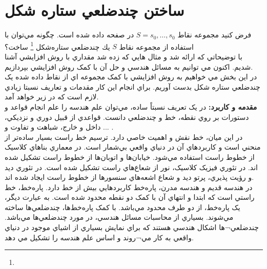 \documentclass{book}
\begin{document}
	    \section*{ساختن چندضلعي ستاره‌ شكل}
	 	فرض كنيد مجموعه نقاط
	 	$S = {s_{0}, \dots, s_{0}}$ 
	 	در صفحه داده شده است. چگونه مي‌توان با استفاده از مجموعه نقاط $S$ يك چندضلعي ستاره‌شكل 
	 	\footnote{}
	 	 ساخت؟\\
	 	با توضيحاتي که ارائه شد و مثال هايي که زده شد مقداري با روش افزايشي آشنا شديم. اکنون مي توانيم به مسائل هندسي و حل آن با کمک روش افزايشي بپردازيم.\\
	 	در اين بخش مي خواهيم به روش افزايشي با کمک مجموعه اي از نقاط داده شده يک چندضلعي ستاره شکل بدست آوريم. براي انجام اين کار مقدمات و تعاريف نسبتا زيادي لازم است که در زير خواهد آمد. \\
	 	\textbf{مقدمه و کاربرد: }
	 	در يک تعريف نسبتاً ساده، مي‌توان علم هندسه را علم انجام قواعد و دستورات بر روي نقطه، خط و چندضلعي دانست. قواعدي از قبيل دوري و نزديکي، داخل و خارج، شباهت و تفاوت و ... .\\
	 	در اين ميان، خط نقش و اهميت خاصي دارد. ترسيم خط راست بسيار ساده‌تر از منحني است و کاربردهاي آن در دنياي واقعي بي‌شمار است. در معماري بناهاي کلاسيک از خطوط راست استفاده مي‌شود. خيابان‌ها و اتوبان‌ها از خطوط راست تشکيل شده‌ اند. در تئوري فيزيک کلاسيک، نور از شعاع‌هاي راست تشکيل شده است. در تئوري ديد و رؤيت پذيري، پرتو ديد و شعاع اشعه‌هاي سنسورها از خطوط راست ايجاد شده اند.\\
	 	در هندسه قديم و هندسه مدرن، پاره‌خط کاربرد‌هايي بيش از خط دارد. پاره‌خط، خط راستي است که ابتدا و انتهاي آن با کمک دو نقطه محدود شده است. به عبارت ديگر، يک پاره‌خط، از دو طرف محدود مي‌باشد. با کمک پاره‌خط‌ها، چندضلعي‌ها ساخته مي‌شوند. بسياري از محاسبات مسائل هندسي، در مورد چندضلعي‌ها مي‌باشد. چندضلعي¬ها اشکال هندسي هستند که براي نمايش بسياري از اشياي موجود در دنياي واقعي به کار مي¬روند و اساس علم هندسه را تشکيل مي دهد. 
\end{document}
